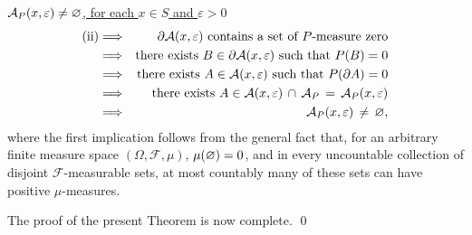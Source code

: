 \vskip 0.5cm
\noindent
\underline{$\mathcal{A}_{P}(x,\varepsilon) \neq \varnothing$, for each $x \in S$ and $\varepsilon > 0$}
\begin{eqnarray*}
\textnormal{(ii)}
&\Longrightarrow&
	\textnormal{$\partial\mathcal{A}(x,\varepsilon)$ contains a set of $P$-measure zero}
\\
&\Longrightarrow&
	\textnormal{there exists $B \in \partial\mathcal{A}(x,\varepsilon)$ such that $P(B) = 0$}
\\
&\Longrightarrow&
	\textnormal{there exists $A \in \mathcal{A}(x,\varepsilon)$ such that $P(\partial A) = 0$}
\\
&\Longrightarrow&
	\textnormal{there exists $A \in \mathcal{A}(x,\varepsilon) \,\cap\, \mathcal{A}_{P} \, = \, \mathcal{A}_{P}(x,\varepsilon)$}
\\
&\Longrightarrow&
	\mathcal{A}_{P}(x,\varepsilon) \,\neq\, \varnothing,
\end{eqnarray*}
where the first implication follows from the general fact that,
for an arbitrary finite measure space $\left(\Omega,\mathcal{F},\mu\right)$,
$\mu(\varnothing) = 0$, and in every uncountable collection of disjoint
$\mathcal{F}$-measurable sets, at most countably many of these sets can have positive $\mu$-measures.

\vskip 0.5cm
\noindent
The proof of the present Theorem is now complete.
\qed
